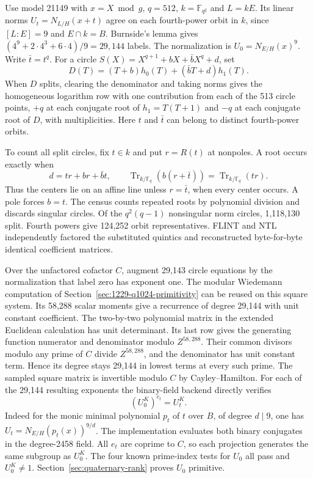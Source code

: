 \documentclass[11pt]{article}
\begin{document}
Use model 21149 with \(x=X\bmod g\), \(q=512\), \(k=\mathbb F_{q^2}\)
and \(L=kE\). Its linear norms \(U_t=N_{L/H}(x+t)\) agree on each
fourth-power orbit in \(k\), since \([L:E]=9\) and \(E\cap k=B\).
Burnside's lemma gives \((4^9+2\cdot4^3+6\cdot4)/9=29{,}144\) labels.
The normalization is \(U_0=N_{E/H}(x)^9\). Write \(\bar t=t^q\).
For a circle \(S(X)=X^{q+1}+bX+\bar b X^q+d\), set
\[
 D(T)=(T+b)h_0(T)+(\bar b T+d)h_1(T).
\]
When \(D\) splits, clearing the denominator and taking norms gives
the homogeneous logarithm row with one contribution from each of the
513 circle points, \(+q\) at each conjugate root of \(h_1=T(T+1)\)
and \(-q\) at each conjugate root of \(D\), with multiplicities.
Here \(t\) and \(\bar t\) can belong to distinct fourth-power orbits.

To count all split circles, fix \(t\in k\) and put \(r=R(t)\) at
nonpoles. A root occurs exactly when
\[
       d=tr+br+\bar b t,\qquad
       \operatorname{Tr}_{k/\mathbb F_q}(b(r+\bar t))
           =\operatorname{Tr}_{k/\mathbb F_q}(tr).
\]
Thus the centers lie on an affine line unless \(r=\bar t\), when every
center occurs. A pole forces \(b=t\). The census counts repeated roots
by polynomial division and discards singular circles. Of the
\(q^2(q-1)\) nonsingular norm circles, 1,118,130 split. Fourth powers
give 124,252 orbit representatives. FLINT and NTL independently
factored the substituted quintics and reconstructed byte-for-byte
identical coefficient matrices.

Over the unfactored cofactor \(C\), augment 29,143 circle equations by
the normalization that label zero has exponent one. The modular
Wiedemann computation of Section~\ref{sec:1229-q1024-primitivity}
can be reused on this square system. Its 58,288 scalar moments give
a recurrence of degree 29,144 with unit constant coefficient. The
two-by-two polynomial matrix in the extended Euclidean calculation
has unit determinant. Its last row gives the generating function
numerator and denominator modulo \(Z^{58{,}288}\). Their common
divisors modulo any prime of \(C\) divide \(Z^{58{,}288}\), and the
denominator has unit constant term. Hence its degree stays 29,144
in lowest terms at every such prime. The sampled square matrix is
invertible modulo \(C\) by Cayley--Hamilton. For
each of the 29,144 resulting exponents the binary-field backend
directly verifies
\[
                  (U_0^K)^{e_t}=U_t^K .
\]
Indeed for the monic minimal polynomial \(p_t\) of \(t\) over \(B\),
of degree \(d\mid9\), one has
\(U_t=N_{E/H}(p_t(x))^{9/d}\). The implementation evaluates both
binary conjugates in the degree-2458 field. All \(e_t\) are coprime to
\(C\), so each projection generates the same subgroup as \(U_0^K\).
The four known prime-index tests for \(U_0\) all pass and \(U_0^K\ne1\).
Section~\ref{sec:quaternary-rank} proves \(U_0\) primitive.
\end{document}
